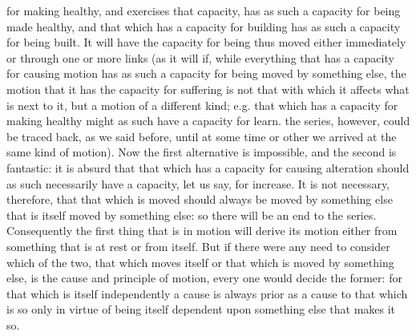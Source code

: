 for making healthy, and exercises that capacity, has as such a capacity
for being made healthy, and that which has a capacity for building
has as such a capacity for being built. It will have the capacity
for being thus moved either immediately or through one or more links
(as it will if, while everything that has a capacity for causing motion
has as such a capacity for being moved by something else, the motion
that it has the capacity for suffering is not that with which it affects
what is next to it, but a motion of a different kind; e.g. that which
has a capacity for making healthy might as such have a capacity for
learn. the series, however, could be traced back, as we said before,
until at some time or other we arrived at the same kind of motion).
Now the first alternative is impossible, and the second is fantastic:
it is absurd that that which has a capacity for causing alteration
should as such necessarily have a capacity, let us say, for increase.
It is not necessary, therefore, that that which is moved should always
be moved by something else that is itself moved by something else:
so there will be an end to the series. Consequently the first thing
that is in motion will derive its motion either from something that
is at rest or from itself. But if there were any need to consider
which of the two, that which moves itself or that which is moved by
something else, is the cause and principle of motion, every one would
decide the former: for that which is itself independently a cause
is always prior as a cause to that which is so only in virtue of being
itself dependent upon something else that makes it so. 

